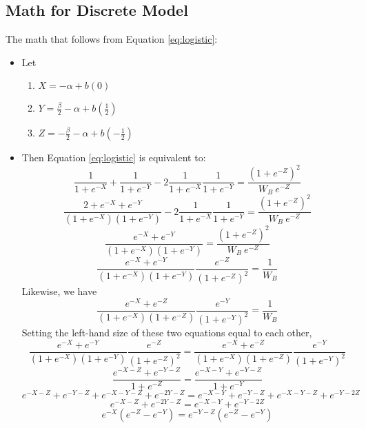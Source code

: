 \documentclass[12pt]{article}
\begin{document}
\subsection{Math for Discrete Model}
The math that follows from Equation \ref{eq:logistic}:
\begin{itemize}
	\item Let
		\begin{enumerate}
			\item $X = -\alpha + b(0)$ 
			\item $Y = \frac{\beta}{2} - \alpha + b\left(\frac{1}{2}\right)$
			\item $Z = -\frac{\beta}{2} - \alpha + b\left(-\frac{1}{2}\right)$
		\end{enumerate}
	\item Then Equation \ref{eq:logistic} is equivalent to:
		\begin{equation}
			\frac{1}{1+e^{-X}} + \frac{1}{1+e^{-Y}} - 2\frac{1}{1+e^{-X}}  \frac{1}{1+e^{-Y}} = \frac{\left(1+e^{-Z}\right)^2}{W_B \: e^{-Z} }
					\label{eq:logistic2}
		\end{equation}
		\[
			\frac{2 + e^{-X} + e^{-Y}}{\left(1+e^{-X}\right)\left(1+e^{-Y}\right)} - 2\frac{1}{1+e^{-X}}  \frac{1}{1+e^{-Y}} = \frac{\left(1+e^{-Z}\right)^2}{W_B \: e^{-Z}}
		\]
		\[
			\frac{e^{-X} + e^{-Y}}{\left(1+e^{-X}\right)\left(1+e^{-Y}\right)} = \frac{\left(1+e^{-Z}\right)^2}{W_B \: e^{-Z}}
		\]
		\begin{equation}
			\frac{e^{-X} + e^{-Y}}{\left(1+e^{-X}\right)\left(1+e^{-Y}\right)} \frac{e^{-Z}}{\left(1+e^{-Z}\right)^2}= \frac{1}{W_B}
		\end{equation}
		Likewise, we have
		\begin{equation}
			\frac{e^{-X} + e^{-Z}}{\left(1+e^{-X}\right)\left(1+e^{-Z}\right)} \frac{e^{-Y}}{\left(1+e^{-Y}\right)^2}= \frac{1}{W_B}
		\end{equation}
		Setting the left-hand size of these two equations equal to each other,
		\[
		  \frac{e^{-X} + e^{-Y}}{\left(1+e^{-X}\right)\left(1+e^{-Y}\right)} \frac{e^{-Z}}{\left(1+e^{-Z}\right)^2}= \frac{e^{-X} + e^{-Z}}{\left(1+e^{-X}\right)\left(1+e^{-Z}\right)} \frac{e^{-Y}}{\left(1+e^{-Y}\right)^2}
		\]
		\[
		  \frac{e^{-X-Z} + e^{-Y-Z}}{1+e^{-Z}}= \frac{e^{-X-Y} + e^{-Y-Z}}{1+e^{-Y}}
		\]
		\[
		  e^{-X-Z} + e^{-Y-Z} + e^{-X-Y-Z} +e^{-2Y-Z}= e^{-X-Y} + e^{-Y-Z} + e^{-X-Y-Z} +e^{-Y-2Z}
		\]
		\[
		  e^{-X-Z} +e^{-2Y-Z}= e^{-X-Y} +e^{-Y-2Z}
		\]
		\[
		  e^{-X}\left(e^{-Z} - e^{-Y} \right) = e^{-Y-Z}\left(e^{-Z} - e^{-Y} \right)
		\]
		


\end{itemize}
\end{document}
